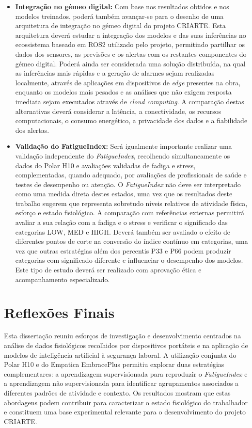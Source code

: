 \begin{itemize}
\item \textbf{Integração no gémeo digital:} 
Com base nos resultados obtidos e nos modelos treinados, poderá também avançar-se para o desenho de uma arquitetura de integração no gémeo digital do projeto CRIARTE. Esta arquitetura deverá estudar a integração dos modelos e das suas inferências no ecossistema baseado em ROS2 utilizado pelo projeto, permitindo partilhar os dados dos sensores, as previsões e os alertas com os restantes componentes do gémeo digital. Poderá ainda ser considerada uma solução distribuída, na qual as inferências mais rápidas e a geração de alarmes sejam realizadas localmente, através de aplicações em dispositivos de \textit{edge} presentes na obra, enquanto os modelos mais pesados e as análises que não exigem resposta imediata sejam executados através de \textit{cloud computing}. A comparação destas alternativas deverá considerar a latência, a conectividade, os recursos computacionais, o consumo energético, a privacidade dos dados e a fiabilidade dos alertas.

\item \textbf{Validação do FatigueIndex:} 
Será igualmente importante realizar uma validação independente do \textit{FatigueIndex}, recolhendo simultaneamente os dados do Polar H10 e avaliações validadas de fadiga e stress, complementadas, quando adequado, por avaliações de profissionais de saúde e testes de desempenho ou atenção. O \textit{FatigueIndex} não deve ser interpretado como uma medida direta destes estados, uma vez que os resultados deste trabalho sugerem que representa sobretudo níveis relativos de atividade física, esforço e estado fisiológico. A comparação com referências externas permitirá avaliar a sua relação com a fadiga e o stress e verificar o significado das categorias LOW, MED e HIGH. Deverá também ser avaliado o efeito de diferentes pontos de corte na conversão do índice contínuo em categorias, uma vez que outras estratégias além dos percentis P33 e P66 podem produzir categorias com significado diferente e influenciar o desempenho dos modelos. Este tipo de estudo deverá ser realizado com aprovação ética e acompanhamento especializado.
\end{itemize}

\section{Reflexões Finais}
\label{sec:reflexoes-finais}

Esta dissertação reuniu esforços de investigação e desenvolvimento centrados na análise de dados fisiológicos recolhidos por dispositivos portáteis e na aplicação de modelos de inteligência artificial à segurança laboral. A utilização conjunta do Polar H10 e do Empatica EmbracePlus permitiu explorar duas estratégias complementares: a aprendizagem supervisionada para reproduzir o \textit{FatigueIndex} e a aprendizagem não supervisionada para identificar agrupamentos associados a diferentes padrões de atividade e contexto. Os resultados mostram que estas abordagens podem contribuir para caracterizar o estado fisiológico do trabalhador e constituem uma base experimental relevante para o desenvolvimento do projeto CRIARTE.

